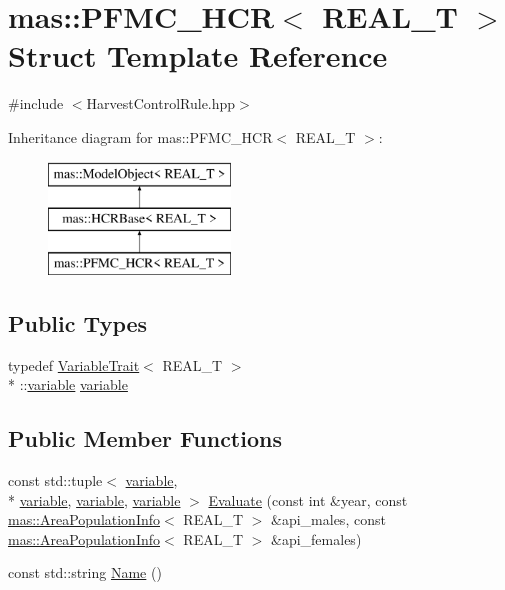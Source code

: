 \hypertarget{structmas_1_1_p_f_m_c___h_c_r}{\section{mas\-:\-:P\-F\-M\-C\-\_\-\-H\-C\-R$<$ R\-E\-A\-L\-\_\-\-T $>$ Struct Template Reference}
\label{structmas_1_1_p_f_m_c___h_c_r}
}


{\ttfamily \#include $<$Harvest\-Control\-Rule.\-hpp$>$}

Inheritance diagram for mas\-:\-:P\-F\-M\-C\-\_\-\-H\-C\-R$<$ R\-E\-A\-L\-\_\-\-T $>$\-:\begin{figure}[H]
\begin{center}
\leavevmode
\includegraphics[height=3.000000cm]{structmas_1_1_p_f_m_c___h_c_r}
\end{center}
\end{figure}
\subsection*{Public Types}
\begin{DoxyCompactItemize}
\item 
typedef \hyperlink{structmas_1_1_variable_trait}{Variable\-Trait}$<$ R\-E\-A\-L\-\_\-\-T $>$\\*
\-::\hyperlink{structmas_1_1_p_f_m_c___h_c_r_a1fd22811f88e2214903cfbf887f68aaf}{variable} \hyperlink{structmas_1_1_p_f_m_c___h_c_r_a1fd22811f88e2214903cfbf887f68aaf}{variable}
\end{DoxyCompactItemize}
\subsection*{Public Member Functions}
\begin{DoxyCompactItemize}
\item 
const std\-::tuple$<$ \hyperlink{structmas_1_1_p_f_m_c___h_c_r_a1fd22811f88e2214903cfbf887f68aaf}{variable}, \\*
\hyperlink{structmas_1_1_p_f_m_c___h_c_r_a1fd22811f88e2214903cfbf887f68aaf}{variable}, \hyperlink{structmas_1_1_p_f_m_c___h_c_r_a1fd22811f88e2214903cfbf887f68aaf}{variable}, \hyperlink{structmas_1_1_p_f_m_c___h_c_r_a1fd22811f88e2214903cfbf887f68aaf}{variable} $>$ \hyperlink{structmas_1_1_p_f_m_c___h_c_r_a8e71e3c20bd5404dd350b9aca573a294}{Evaluate} (const int \&year, const \hyperlink{structmas_1_1_area_population_info}{mas\-::\-Area\-Population\-Info}$<$ R\-E\-A\-L\-\_\-\-T $>$ \&api\-\_\-males, const \hyperlink{structmas_1_1_area_population_info}{mas\-::\-Area\-Population\-Info}$<$ R\-E\-A\-L\-\_\-\-T $>$ \&api\-\_\-females)
\item 
const std\-::string \hyperlink{structmas_1_1_p_f_m_c___h_c_r_a5571d69b3043c8a56b92e96a4f1837b5}{Name} ()
\end{DoxyCompactItemize}
